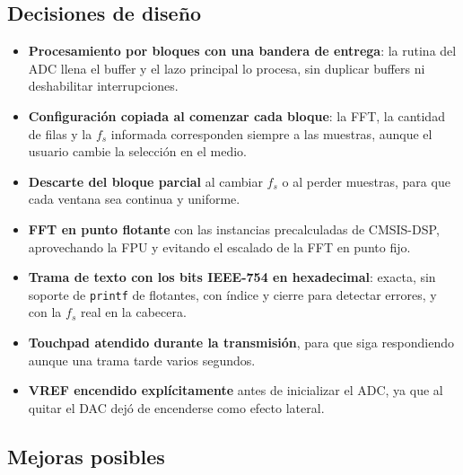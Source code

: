 \documentclass[11pt,a4paper]{article}
\begin{document}

\subsection{Decisiones de diseño}

\begin{itemize}[nosep]
  \item \textbf{Procesamiento por bloques con una bandera de entrega}: la
        rutina del ADC llena el buffer y el lazo principal lo procesa, sin
        duplicar buffers ni deshabilitar interrupciones.
  \item \textbf{Configuración copiada al comenzar cada bloque}: la FFT, la
        cantidad de filas y la $f_s$ informada corresponden siempre a las
        muestras, aunque el usuario cambie la selección en el medio.
  \item \textbf{Descarte del bloque parcial} al cambiar $f_s$ o al perder
        muestras, para que cada ventana sea continua y uniforme.
  \item \textbf{FFT en punto flotante} con las instancias precalculadas de
        CMSIS-DSP, aprovechando la FPU y evitando el escalado de la FFT en
        punto fijo.
  \item \textbf{Trama de texto con los bits IEEE-754 en hexadecimal}: exacta,
        sin soporte de \texttt{printf} de flotantes, con índice y cierre
        para detectar errores, y con la $f_s$ real en la cabecera.
  \item \textbf{Touchpad atendido durante la transmisión}, para que siga
        respondiendo aunque una trama tarde varios segundos.
  \item \textbf{VREF encendido explícitamente} antes de inicializar el ADC,
        ya que al quitar el DAC dejó de encenderse como efecto lateral.
\end{itemize}

\subsection{Mejoras posibles}\label{sec:mejoras}
\end{document}
